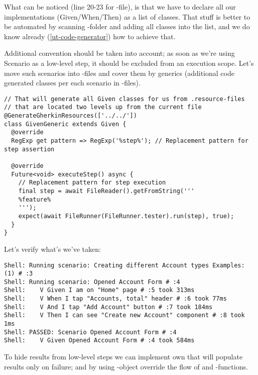 What can be noticed (line 20-23 for -file), is that we have to declare all our 
implementations (Given/When/Then) as a list of classes. That stuff is better to be automated by scanning 
-folder and adding all classes into the list, and we do know already (\ref{ut-code-generator}) how to 
achieve that.

Additional convention should be taken into account; as soon as we're using Scenario as a low-level step, it should be
excluded from an execution scope. Let's move such scenarios into -files and cover them by generics 
(additional code generated classes per each scenario in -files).

\begin{lstlisting}
// That will generate all Given classes for us from .resource-files
// that are located two levels up from the current file
@GenerateGherkinResources(['../../'])
class GivenGeneric extends Given {
  @override
  RegExp get pattern => RegExp('%step%'); // Replacement pattern for step assertion

  @override
  Future<void> executeStep() async {
    // Replacement pattern for step execution
    final step = await FileReader().getFromString('''
    %feature%
    ''');
    expect(await FileRunner(FileRunner.tester).run(step), true);
  }
}
\end{lstlisting}

\noindent Let's verify what's we've taken:

\begin{lstlisting}[language=terminal]
Shell: Running scenario: Creating different Account types Examples: (1) # :3
Shell: Running scenario: Opened Account Form # :4
Shell:    V Given I am on "Home" page # :5 took 313ms
Shell:    V When I tap "Accounts, total" header # :6 took 77ms
Shell:    V And I tap "Add Account" button # :7 took 184ms
Shell:    V Then I can see "Create new Account" component # :8 took 1ms
Shell: PASSED: Scenario Opened Account Form # :4
Shell:    V Given Opened Account Form # :4 took 584ms
\end{lstlisting}

\noindent To hide results from low-level steps we can implement own  that will populate results only 
on failure; and by using -object override the flow of  and -functions.

